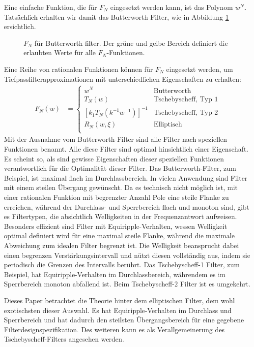 Eine einfache Funktion, die für $F_N$ eingesetzt werden kann, ist das Polynom $w^N$.
Tatsächlich erhalten wir damit das Butterworth Filter, wie in Abbildung \ref{ellfilter:fig:butterworth} ersichtlich.
\begin{figure}
    \centering
    
    \caption{$F_N$ für Butterworth filter. Der grüne und gelbe Bereich definiert die erlaubten Werte für alle $F_N$-Funktionen.}
    \label{ellfilter:fig:butterworth}
\end{figure}
Eine Reihe von rationalen Funktionen können für $F_N$ eingesetzt werden, um Tiefpassfilter\-approximationen mit unterschiedlichen Eigenschaften zu erhalten:
\begin{align}
    F_N(w) & =
    \begin{cases}
        w^N                            & \text{Butterworth} \\
        T_N(w)                         & \text{Tschebyscheff, Typ 1}  \\
        [k_1 T_N (k^{-1} w^{-1})]^{-1} & \text{Tschebyscheff, Typ 2}  \\
        R_N(w, \xi)                    & \text{Elliptisch}    \\
    \end{cases}
\end{align}
Mit der Ausnahme vom Butterworth-Filter sind alle Filter nach speziellen Funktionen benannt.
Alle diese Filter sind optimal hinsichtlich einer Eigenschaft.
Es scheint so, als sind gewisse Eigenschaften dieser speziellen Funktionen verantwortlich für die Optimalität dieser Filter.
Das Butterworth-Filter, zum Beispiel, ist maximal flach im Durchlassbereich.
In vielen Anwendung sind Filter mit einem steilen Übergang gewünscht.
Da es technisch nicht möglich ist, mit einer rationalen Funktion mit begrenzter Anzahl Pole eine steile Flanke zu erreichen, während der Durchlass- und Sperrbereich flach und monoton sind, gibt es Filtertypen, die absichtlich Welligkeiten in der Frequenzantwort aufweisen.
Besonders effizient sind Filter mit Equiripple-Verhalten, wessen Welligkeit optimal definiert wird für eine maximal steile Flanke, während die maximale Abweichung zum idealen Filter begrenzt ist.
Die Welligkeit beansprucht dabei einen begrenzen Verstärkungsintervall und nützt diesen vollständig aus, indem sie periodisch die Grenzen des Intervalls berührt.
Das Tschebyscheff-1 Filter, zum Beispiel, hat Equiripple-Verhalten im Durchlassbereich, währendem es im Sperrbereich monoton abfallend ist.
Beim Tschebyscheff-2 Filter ist es umgekehrt.

Dieses Paper betrachtet die Theorie hinter dem elliptischen Filter, dem wohl exotischsten dieser Auswahl.
Es hat Equiripple-Verhalten im Durchlass und Sperrbereich und hat dadurch den steilsten Übergangsbereich für eine gegebene Filterdesignspezifikation.
Des weiteren kann es als Verallgemeinerung des Tschebyscheff-Filters angesehen werden.
